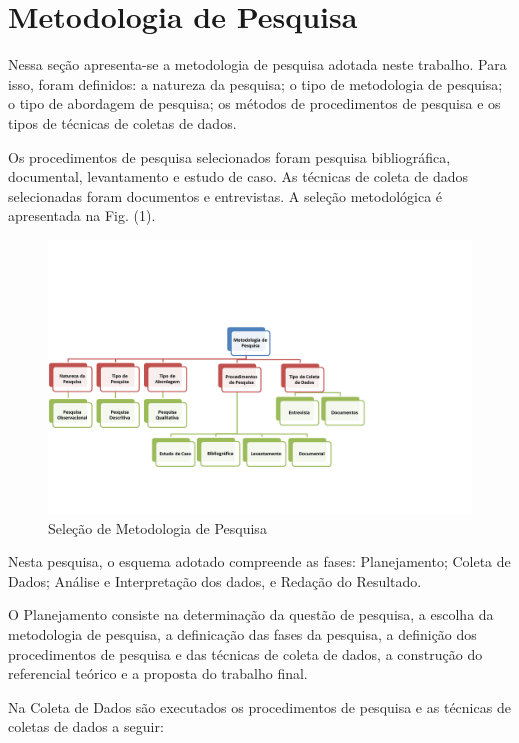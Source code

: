 \section[Metodologia de Pesquisa]{Metodologia de Pesquisa}

Nessa seção apresenta-se a metodologia de pesquisa adotada neste trabalho.
Para isso, foram definidos: a natureza da pesquisa; o tipo de metodologia de pesquisa; o tipo de abordagem de pesquisa; os métodos de
procedimentos de pesquisa e os tipos de técnicas de coletas de dados.

Os procedimentos de pesquisa selecionados foram pesquisa bibliográfica,
documental, levantamento e estudo de caso. As técnicas de coleta de dados selecionadas foram
documentos e entrevistas. A seleção
metodológica é apresentada na Fig. (1).

	\begin{figure}[h]
		\centering
		\label{fig01}
			\includegraphics[scale=0.7]{figuras/metodologiapesquisa.png}
		\caption{Seleção de Metodologia de Pesquisa}
	\end{figure}

Nesta pesquisa, o esquema adotado compreende as fases: Planejamento; Coleta
de Dados; Análise e Interpretação dos dados, e Redação do Resultado. 

O Planejamento consiste na determinação da questão de pesquisa, a escolha da metodologia de pesquisa, a definicação das fases da pesquisa,  a definição dos procedimentos de pesquisa e das técnicas de coleta de dados, a construção do referencial teórico e a proposta do trabalho final.


Na Coleta de Dados são executados os procedimentos de pesquisa e as técnicas de coletas de dados a seguir:

